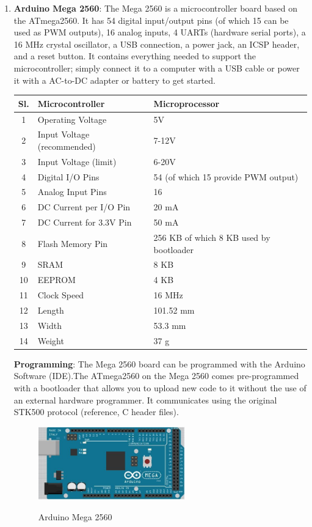 \begin{enumerate}
	\item \textbf{Arduino Mega 2560}: The Mega 2560 is a microcontroller board based on the ATmega2560. It has 54 digital input/output pins (of which 15 can be used as PWM outputs), 16 analog inputs, 4 UARTs (hardware serial ports), a 16 MHz crystal oscillator, a USB connection, a power jack, an ICSP header, and a reset button. It contains everything needed to support the microcontroller; simply connect it to a computer with a USB cable or power it with a AC-to-DC adapter or battery to get started. 

\begin{center}
 \begin{tabular}{| c |  p{6cm} | p{6cm} |} 
 \hline
 Sl. & Microcontroller & Microprocessor \\ [0.5ex] 
 \hline\hline
 1 & Operating Voltage & 5V \\ 
 \hline
 2 & Input Voltage (recommended) & 7-12V \\
 \hline
 3 & Input Voltage (limit) & 6-20V \\
 \hline
 4 & Digital I/O Pins & 54 (of which 15 provide PWM output) \\
 \hline
 5 & Analog Input Pins & 16 \\
 \hline
6 & DC Current per I/O Pin & 20 mA \\
 \hline
7 & DC Current for 3.3V Pin & 50 mA \\
 \hline
8 & Flash Memory Pin & 256 KB of which 8 KB used by bootloader \\
 \hline
9 & SRAM & 8 KB \\
 \hline
10 & EEPROM & 4 KB \\
 \hline
11 & Clock Speed & 16 MHz \\
 \hline
12 & Length & 101.52 mm \\
 \hline
13 & Width & 53.3 mm \\
 \hline
14 & Weight & 37 g \\
 \hline
\end{tabular}
\end{center}

\textbf{Programming}: The Mega 2560 board can be programmed with the Arduino Software (IDE).The ATmega2560 on the Mega 2560 comes pre-programmed with a bootloader that allows you to upload new code to it without the use of an external hardware programmer. It communicates using the original STK500 protocol (reference, C header files).
\begin{figure}
\centering
\includegraphics[width=0.6\textwidth]{./arduino}\\[0.1in]
\label{fig:Arduino Mega 2560}
\caption{Arduino Mega 2560}
\end{figure}



\end{enumerate}
